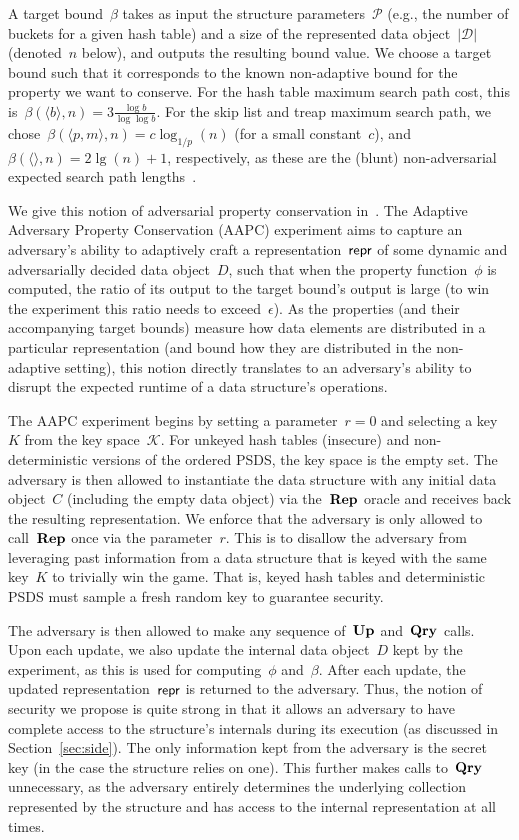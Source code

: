 A target bound~$\beta$ takes as input the structure parameters~$\mathcal{P}$ (e.g., the number of buckets for a given hash table) and a size of the represented data object~$|\mathcal{D}|$ (denoted~$n$ below), and outputs the resulting bound value. We choose a target bound such that it corresponds to the known non-adaptive bound for the property we want to conserve. For the hash table maximum search path cost, this is~$\beta(\langle b \rangle, n) = 3\frac{\log b}{\log \log b}$. For the skip list and treap maximum search path, we chose~$\beta (\langle p,m \rangle, n) = c \log_{1/p}(n)$ (for a small constant~$c$), and $\beta (\langle  \rangle, n) = 2\lg(n)+1$, respectively, as these are the (blunt) non-adversarial expected search path lengths~\cite{pugh,reingold1994randomized}.

We give this notion of adversarial property conservation in~. The Adaptive Adversary Property Conservation (AAPC) experiment aims to capture an adversary's ability to adaptively craft a representation~$\mathsf{repr}$ of some dynamic and adversarially decided data object~$D$, such that when the property function~$\phi$ is computed, the ratio of its output to the target bound's output is large (to win the experiment this ratio needs to exceed~$\epsilon$). As the properties (and their accompanying target bounds) measure how data elements are distributed in a particular representation (and bound how they are distributed in the non-adaptive setting), this notion directly translates to an adversary's ability to disrupt the expected runtime of a data structure's operations. 

The AAPC experiment begins by setting a parameter~$r=0$ and selecting a key~$K$ from the key space~$\mathcal{K}$. For unkeyed hash tables (insecure) and non-deterministic versions of the ordered PSDS, the key space is the empty set. The adversary is then allowed to instantiate the data structure with any initial data object~$C$ (including the empty data object) via the~$\textup{\textbf{Rep}}\hspace{0.5pt}$ oracle and receives back the resulting representation. We enforce that the adversary is only allowed to call~$\textup{\textbf{Rep}}\hspace{0.5pt}$ once via the parameter~$r$. This is to disallow the adversary from leveraging past information from a data structure that is keyed with the same key~$K$ to trivially win the game. That is, keyed hash tables and deterministic PSDS must sample a fresh random key to guarantee security. 

The adversary is then allowed to make any sequence of~$\textup{\textbf{Up}}\hspace{0.5pt}$ and~$\textup{\textbf{Qry}}\hspace{0.5pt}$ calls. Upon each update, we also update the internal data object~$D$ kept by the experiment, as this is used for computing~$\phi$ and~$\beta$. After each update, the updated representation~$\mathsf{repr}$ is returned to the adversary. Thus, the notion of security we propose is quite strong in that it allows an adversary to have complete access to the structure's internals during its execution (as discussed in Section~\ref{sec:side}). The only information kept from the adversary is the secret key (in the case the structure relies on one). This further makes calls to~$\textup{\textbf{Qry}}\hspace{0.5pt}$ unnecessary, as the adversary entirely determines the underlying collection represented by the structure and has access to the internal representation at all times. 

